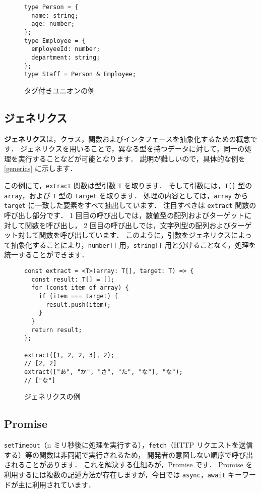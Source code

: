 \documentclass[a4j, 11pt]{jarticle}
\begin{document}
\begin{figure}[H]
\caption{タグ付きユニオンの例}
\label{intersection}
\begin{lstlisting}
type Person = {
  name: string;
  age: number;
};
type Employee = {
  employeeId: number;
  department: string;
};
type Staff = Person & Employee;
\end{lstlisting}
\end{figure}

\subsection{ジェネリクス}

\textbf{ジェネリクス}は，クラス，関数およびインタフェースを抽象化するための概念です．
ジェネリクスを用いることで，異なる型を持つデータに対して，同一の処理を実行することなどが可能となります．
説明が難しいので，具体的な例を \autoref{generics} に示します．

この例にて，\verb|extract| 関数は型引数 \verb|T| を取ります．
そして引数には，\verb|T[]| 型の \verb|array|，および \verb|T| 型の \verb|target| を取ります．
処理の内容としては，\verb|array| から \verb|target| に一致した要素をすべて抽出しています．
注目すべきは \verb|extract| 関数の呼び出し部分です．
1 回目の呼び出しでは，数値型の配列およびターゲットに対して関数を呼び出し，
2 回目の呼び出しでは，文字列型の配列およびターゲット対して関数を呼び出しています．
このように，引数をジェネリクスによって抽象化することにより，\verb|number[]| 用，\verb|string[]| 用と分けることなく，処理を統一することができます．

\begin{figure}[H]
\caption{ジェネリクスの例}
\label{generics}
\begin{lstlisting}
const extract = <T>(array: T[], target: T) => {
  const result: T[] = [];
  for (const item of array) {
    if (item === target) {
      result.push(item);
    }
  }
  return result;
};

extract([1, 2, 2, 3], 2);
// [2, 2]
extract(["あ", "か", "さ", "た", "な"], "な");
// ["な"]
\end{lstlisting}
\end{figure}

\subsection{Promise}

\verb|setTimeout|（n ミリ秒後に処理を実行する），\verb|fetch|（HTTP リクエストを送信する）等の関数は非同期で実行されるため，
開発者の意図しない順序で呼び出されることがあります．
これを解決する仕組みが，Promise です．
Promise を利用するには複数の記述方法が存在しますが，今日では \verb|async|，\verb|await| キーワードが主に利用されています．
\end{document}
